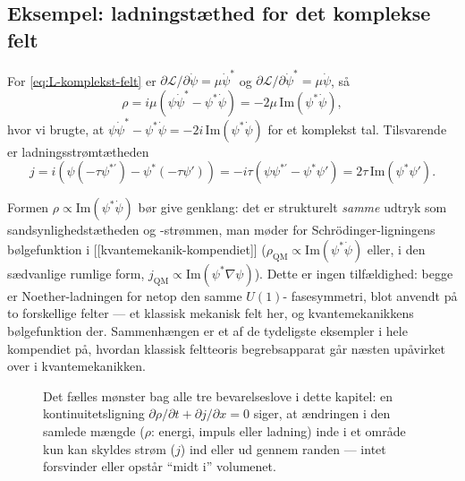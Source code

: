 \subsection{Eksempel: ladningstæthed for det komplekse felt}

\begin{eksempel}
For \eqref{eq:L-komplekst-felt} er
$\partial\mathcal{L}/\partial\dot\psi=\mu\dot\psi^\ast$ og
$\partial\mathcal{L}/\partial\dot\psi^\ast=\mu\dot\psi$, så
\begin{equation}
  \rho = i\mu\left(\psi\dot\psi^\ast - \psi^\ast\dot\psi\right) = -2\mu\,\text{Im}(\psi^\ast\dot\psi),
\end{equation}
hvor vi brugte, at $\psi\dot\psi^\ast-\psi^\ast\dot\psi=-2i\,\text{Im}(\psi^\ast\dot\psi)$
for et komplekst tal. Tilsvarende er ladningsstrømtætheden
\begin{equation}
  j = i\left(\psi(-\tau\psi^{\ast\prime}) - \psi^\ast(-\tau\psi')\right)
    = -i\tau\left(\psi\psi^{\ast\prime}-\psi^\ast\psi'\right) = 2\tau\,\text{Im}(\psi^\ast\psi').
\end{equation}

\begin{bemaerkning}
Formen $\rho\propto\text{Im}(\psi^\ast\dot\psi)$ bør give genklang: det
er strukturelt \emph{samme} udtryk som sandsynlighedstætheden og
-strømmen, man møder for Schrödinger-ligningens bølgefunktion i
[[kvantemekanik-kompendiet]] ($\rho_{\text{QM}}\propto\text{Im}(\psi^\ast\dot\psi)$
eller, i den sædvanlige rumlige form,
$j_{\text{QM}}\propto\text{Im}(\psi^\ast\nabla\psi)$). Dette er ingen
tilfældighed: begge er Noether-ladningen for netop den samme $U(1)$-
fasesymmetri, blot anvendt på to forskellige felter — et klassisk
mekanisk felt her, og kvantemekanikkens bølgefunktion der. Sammenhængen
er et af de tydeligste eksempler i hele kompendiet på, hvordan
klassisk feltteoris begrebsapparat går næsten upåvirket over i
kvantemekanikken.
\end{bemaerkning}
\end{eksempel}

\begin{figure}[htbp]
  \centering
  \caption{Det fælles mønster bag alle tre bevarelseslove i dette
  kapitel: en kontinuitetsligning $\partial\rho/\partial t+\partial j/\partial x=0$
  siger, at ændringen i den samlede mængde ($\rho$: energi, impuls
  eller ladning) inde i et område kun kan skyldes strøm ($j$) ind eller
  ud gennem randen — intet forsvinder eller opstår ``midt i'' volumenet.}
  \label{fig:kontinuitet-generel}
\end{figure}

